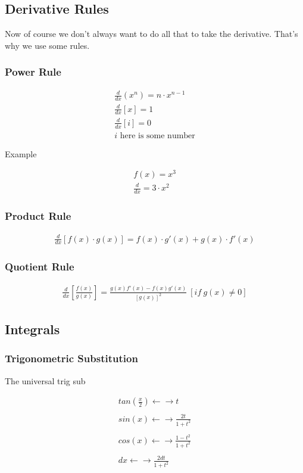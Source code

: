 \documentclass{article}
\begin{document}
\subsection{Derivative Rules}
Now of course we don't always want to do all that to take the derivative.
That's why we use some rules.

\subsubsection{Power Rule}
\begin{align*}
    \frac{d}{dx}(x^n)=n \cdot x^{n-1}
    \\
    \frac{d}{dx}[x]=1
    \\
    \frac{d}{dx}[i]=0
    \\
    i \text{ here is some number}
\end{align*}

Example

\begin{align*}
    f(x)=x^3
    \\
    \frac{d}{dx}=3 \cdot x^2
\end{align*}

\subsubsection{Product Rule}
\begin{align*}
    \frac{d}{dx}[f(x) \cdot g(x)] = f(x) \cdot g'(x) + g(x) \cdot f'(x)
\end{align*}

\subsubsection{Quotient Rule}
\begin{align*}
    \frac{d}{dx}[\frac{f(x)}{g(x)}] = \frac{g(x)f'(x)-f(x)g'(x)}{[g(x)]^2} \ [if\ g(x) \neq 0]
\end{align*}

\subsection{Integrals}
\subsubsection{Trigonometric Substitution}
The universal trig sub

\begin{align*}
    tan(\frac{x}{2}) \leftarrow\rightarrow t
    \\\\
    sin(x) \leftarrow\rightarrow \frac{2t}{1+t^2}
    \\\\
    cos(x) \leftarrow\rightarrow \frac{1-t^2}{1+t^2}
    \\\\
    dx \leftarrow\rightarrow \frac{2dt}{1+t^2}
\end{align*}
\end{document}
